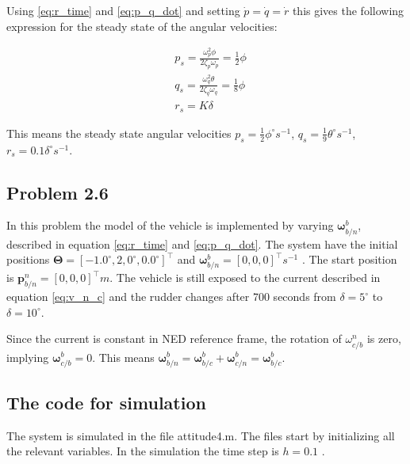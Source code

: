 Using \eqref{eq:r_time} and \eqref{eq:p_q_dot} and setting $\dot{p} =\dot{q} = \dot{r}$ this gives the following expression for the steady state of the angular  velocities:

\begin{equation}
\begin{aligned}
	& p_s = \frac{\omega_p^2 \phi}{ 2\zeta_p\omega_p} = \frac{1}{2} \phi \\
	& q_s = \frac{\omega_q^2 \theta}{2\zeta_q\omega_q} = \frac{1}{8} \phi \\
	& r_s = K \delta
	\label{eq:p_q_dot}
\end{aligned}
\end{equation}

This means the steady state angular velocities $p_s = \frac{1}{2} \phi ^\circ s^{-1}$, $q_s = \frac{1}{9} \theta ^\circ s^{-1}$, $r_s = 0.1 \delta ^\circ s^{-1}$. 

\subsection*{Problem 2.6}

In this problem the model of the vehicle is implemented by varying $\boldsymbol{\omega}^b_{b/n}$, described in equation \eqref{eq:r_time} and \eqref{eq:p_q_dot}. The system have the initial positions $\boldsymbol{\Theta} = [-1.0^\circ, 2,0^\circ, 0.0^\circ]^\top$ and $\boldsymbol{\omega}^b_{b/n} = [0,0,0]^\top s^{-1}$ . The start position is $\mathbf{p}^n_{b/n} = [0,0,0]^\top m$. The vehicle is still exposed to the current described in equation \eqref{eq:v_n_c}  and the rudder changes after 700 seconds from $\delta = 5^\circ$ to $\delta = 10^\circ$.

Since the current is constant in NED reference frame, the rotation of $\omega^n_{c/b} $ is zero, implying $\boldsymbol{\omega}^b_{c/b} = 0$. This means $ \boldsymbol{\omega}^b_{b/n} = \boldsymbol{\omega}^b_{b/c} + \boldsymbol{\omega}^b_{c/n}  = \boldsymbol{\omega}^b_{b/c} $. 

\subsection*{The code for simulation}

The system is simulated in the file {\color{blue} attitude4.m}. The files start by initializing all the relevant variables. In the simulation the time step is $h = 0.1$ .

